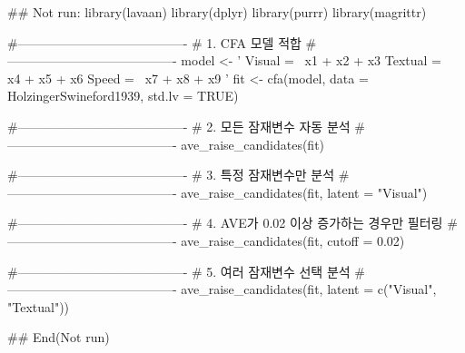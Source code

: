 \documentclass[a4paper]{book}
\begin{document}
\begin{Examples}
\begin{ExampleCode}
\#\# Not run: 
library(lavaan)
library(dplyr)
library(purrr)
library(magrittr)

#----------------------------------------
# 1. CFA 모델 적합
#----------------------------------------
model <- '
  Visual  =~ x1 + x2 + x3
  Textual =~ x4 + x5 + x6
  Speed   =~ x7 + x8 + x9
'
fit <- cfa(model, data = HolzingerSwineford1939, std.lv = TRUE)

#----------------------------------------
# 2. 모든 잠재변수 자동 분석
#----------------------------------------
ave_raise_candidates(fit)

#----------------------------------------
# 3. 특정 잠재변수만 분석
#----------------------------------------
ave_raise_candidates(fit, latent = "Visual")

#----------------------------------------
# 4. AVE가 0.02 이상 증가하는 경우만 필터링
#----------------------------------------
ave_raise_candidates(fit, cutoff = 0.02)

#----------------------------------------
# 5. 여러 잠재변수 선택 분석
#----------------------------------------
ave_raise_candidates(fit, latent = c("Visual", "Textual"))

## End(Not run)
\end{ExampleCode}
\end{Examples}
\end{document}

